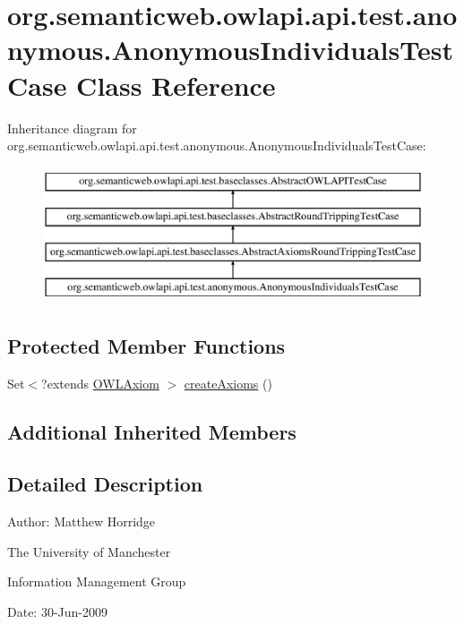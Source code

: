\hypertarget{classorg_1_1semanticweb_1_1owlapi_1_1api_1_1test_1_1anonymous_1_1_anonymous_individuals_test_case}{\section{org.\-semanticweb.\-owlapi.\-api.\-test.\-anonymous.\-Anonymous\-Individuals\-Test\-Case Class Reference}
\label{classorg_1_1semanticweb_1_1owlapi_1_1api_1_1test_1_1anonymous_1_1_anonymous_individuals_test_case}
}
Inheritance diagram for org.\-semanticweb.\-owlapi.\-api.\-test.\-anonymous.\-Anonymous\-Individuals\-Test\-Case\-:\begin{figure}[H]
\begin{center}
\leavevmode
\includegraphics[height=4.000000cm]{classorg_1_1semanticweb_1_1owlapi_1_1api_1_1test_1_1anonymous_1_1_anonymous_individuals_test_case}
\end{center}
\end{figure}
\subsection*{Protected Member Functions}
\begin{DoxyCompactItemize}
\item 
Set$<$?extends \hyperlink{interfaceorg_1_1semanticweb_1_1owlapi_1_1model_1_1_o_w_l_axiom}{O\-W\-L\-Axiom} $>$ \hyperlink{classorg_1_1semanticweb_1_1owlapi_1_1api_1_1test_1_1anonymous_1_1_anonymous_individuals_test_case_a45afce79f45a62be5a8905575d06a0b0}{create\-Axioms} ()
\end{DoxyCompactItemize}
\subsection*{Additional Inherited Members}


\subsection{Detailed Description}
Author\-: Matthew Horridge\par
 The University of Manchester\par
 Information Management Group\par
 Date\-: 30-\/\-Jun-\/2009 

